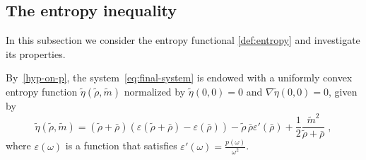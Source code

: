 \documentclass[10pt,reqno]{amsart}
\newcommand{\eps}{\varepsilon}
\begin{document}
\subsection{The entropy inequality} 
In this subsection we consider the entropy functional \eqref{def:entropy} and investigate its properties.

By~\eqref{hyp-on-p}, the system~\eqref{eq:final-system}  is endowed with a uniformly convex entropy function $\tilde\eta(\tilde\rho,\tilde m)$ normalized by $\tilde\eta(0,0)=0$ and $\nabla\tilde\eta(0,0)=0$, given by 
\begin{equation*}
    \tilde\eta(\tilde\rho,\tilde m)= (\tilde\rho+\bar\rho)(\eps(\tilde\rho+\bar\rho)-\eps(\bar\rho))-\tilde\rho\,\bar\rho\eps'(\bar\rho)+\frac{1}{2}\frac{\tilde m^2}{\tilde\rho+\bar\rho}\;,
\end{equation*}
where $\eps(\omega)$ is a function  that satisfies $\eps'(\omega)=\frac{p(\omega)}{\omega^2}$.
\end{document}
